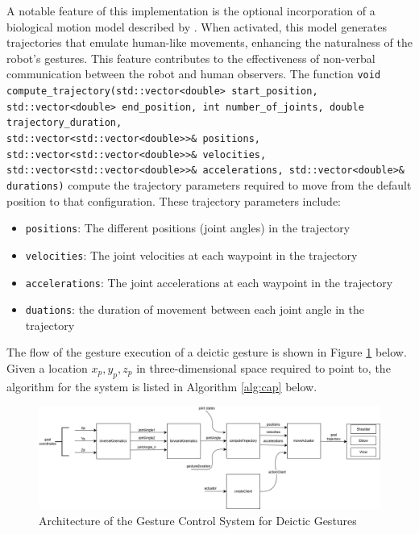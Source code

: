 \documentclass{CSSRforAfrica}
\begin{document}
A notable feature of this implementation is the optional incorporation of a biological motion model described by \cite{Huberetal2008}. When activated, this model generates trajectories that emulate human-like movements, enhancing the naturalness of the robot's gestures. This feature contributes to the effectiveness of non-verbal communication between the robot and human observers.  The function {\footnotesize \texttt{void compute\_trajectory(std::vector<double> start\_position, std::vector<double> end\_position, int number\_of\_joints, double trajectory\_duration, \\std::vector<std::vector<double>>\& positions, std::vector<std::vector<double>>\& velocities, std::vector<std::vector<double>>\& accelerations, std::vector<double>\& durations)}} compute the trajectory parameters required to move from the default position to that configuration. These trajectory parameters include:
\begin{itemize}
    \item \texttt{positions}: The different positions (joint angles) in the trajectory
    \item \texttt{velocities}: The joint velocities at each waypoint in the trajectory
    \item \texttt{accelerations}: The joint accelerations at each waypoint in the trajectory
    \item \texttt{duations}: the duration of movement between each joint angle in the trajectory
\end{itemize} 


The flow of the gesture execution of a deictic gesture is shown in Figure \ref{fig:architecture} below. Given a location $x_p, y_p, z_p$  in three-dimensional space required to point to, the algorithm for the system is listed in Algorithm \ref{alg:cap} below.

\begin{figure}[h!]
  \centering \includegraphics[scale=0.4]{Architecture.png}
  \caption{Architecture of the Gesture Control System for Deictic Gestures}
\label{fig:architecture}
\end{figure}
\end{document}
